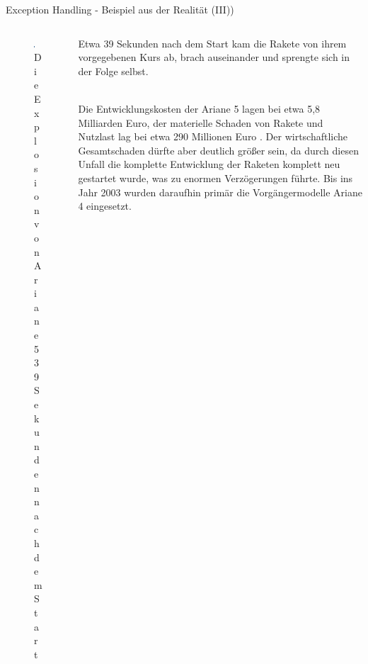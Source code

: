    \begin{frame}[fragile]{Exception Handling - Beispiel aus der Realität (III))}
    
    
    \begin{minipage}{\textwidth}
\begin{columns}[T]
\begin{column}{0.5\textwidth}
\begin{figure}
\includegraphics[keepaspectratio, width=0.9\linewidth]{chapters/10_python4_further_topics/figures/ariane.jpeg}
\caption{Die Explosion von Ariane 5 39 Sekunden nach dem Start}
\end{figure} 
\end{column}
\begin{column}{0.5\textwidth}
Etwa 39 Sekunden nach dem Start kam die Rakete von ihrem vorgegebenen Kurs ab, brach auseinander und sprengte sich in der Folge selbst.\\~\

Die Entwicklungskosten der Ariane 5 lagen bei etwa 5,8 Milliarden Euro, der materielle Schaden von Rakete und Nutzlast lag bei etwa 290 Millionen Euro \cite{arianefailure}. Der wirtschaftliche Gesamtschaden dürfte aber deutlich größer sein, da durch diesen Unfall die komplette Entwicklung der Raketen komplett neu gestartet wurde, was zu enormen Verzögerungen führte. Bis ins Jahr 2003 wurden daraufhin primär die Vorgängermodelle Ariane 4 eingesetzt.

\end{column}
\end{columns}
\end{minipage}



    \end{frame}
    
